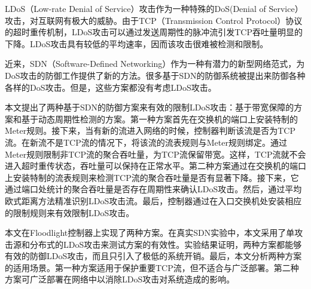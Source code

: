 \begin{cabstract}
  LDoS（Low-rate Denial of Service）攻击作为一种特殊的DoS(Denial of Service）攻击，对互联网有极大的威胁。由于TCP（Transmission Control Protocol）协议的超时重传机制，LDoS攻击可以通过发送周期性的脉冲流引发TCP吞吐量明显的下降。LDoS攻击具有较低的平均速率，因而该攻击很难被检测和限制。

  近来，SDN（Software-Defined Networking）作为一种有潜力的新型网络范式，为DoS攻击的防御工作提供了新的方法。很多基于SDN的防御系统被提出来防御各种各样的DoS攻击。但是，这些方案都没有考虑LDoS攻击。

  本文提出了两种基于SDN的防御方案来有效的限制LDoS攻击：基于带宽保障的方案和基于动态周期性检测的方案。第一种方案首先在交换机的端口上安装特制的Meter规则。接下来，当有新的流进入网络的时候，控制器判断该流是否为TCP流。在新流不是TCP流的情况下，将该流的流表规则与Meter规则绑定。通过Meter规则限制非TCP流的聚合吞吐量，为TCP流保留带宽。这样，TCP流就不会进入超时重传状态，吞吐量可以保持在正常水平。第二种方案通过在交换机的端口上安装特制的流表规则来检测TCP流的聚合吞吐量是否有显著下降。接下来，它通过端口处统计的聚合吞吐量是否存在周期性来确认LDoS攻击。然后，通过平均欧式距离方法精准识别LDoS攻击流。最后，控制器通过在入口交换机处安装相应的限制规则来有效限制LDoS攻击。

  本文在Floodlight控制器上实现了两种方案。在真实SDN实验中，本文采用了单攻击源和分布式的LDoS攻击来测试方案的有效性。实验结果证明，两种方案都能够有效的防御LDoS攻击，而且只引入了极低的系统开销。最后，本文分析两种方案的适用场景。第一种方案适用于保护重要TCP流，但不适合与广泛部署。第二种方案可广泛部署在网络中以消除LDoS攻击对系统造成的影响。

\end{cabstract}


